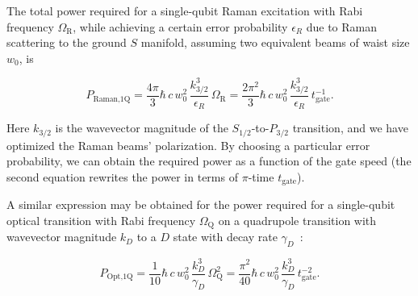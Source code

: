 \documentclass[%
12pt,
 amsmath,amssymb,
]{revtex4-2}
\begin{document}
The total power required for a single-qubit Raman excitation with Rabi frequency $\Omega_{\textrm{R}}$, while achieving a certain error probability $\epsilon_R$ due to Raman scattering to the ground $S$ manifold, assuming two equivalent beams of waist size $w_0$, is~\cite{PhysRevA.75.042329_2007}

\begin{equation}
P_{\textrm{Raman,1Q}}=\frac{4\pi}{3} \hbar\, c\, w_{0}^{2}\, \frac{k_{3/2}^{3}}{\epsilon_R}\, \Omega_{\textrm{R}}=\frac{2\pi^{2}}{3} \hbar\, c\, w_{0}^{2}\, \frac{k_{3/2}^{3}}{\epsilon_R}\, t^{-1}_{\textrm{gate}}.
\label{p_raman}
\end{equation}


\noindent Here $k_{3/2}$ is the wavevector magnitude of the $S_{1/2}$-to-$P_{3/2}$ transition, and we have optimized the Raman beams' polarization.  By choosing a particular error probability, we can obtain the required power as a function of the gate speed (the second equation rewrites the power in terms of $\pi$-time $t_{\textrm{gate}}$).

A similar expression may be obtained for the power required for a single-qubit optical transition with Rabi frequency $\Omega_{\textrm{Q}}$ on a quadrupole transition with wavevector magnitude $k_{D}$ to a $D$ state with decay rate $\gamma_{D}$~\cite{James1998}:

\begin{equation}
P_{\textrm{Opt,1Q}}=\frac{1}{10} \hbar\, c\, w_{0}^{2}\, \frac{k_{D}^{3}}{\gamma_{D}}\, \Omega^{2}_{\textrm{Q}}=\frac{\pi^{2}}{40} \hbar\, c\, w_{0}^{2}\, \frac{k_{D}^{3}}{\gamma_{D}}\, t^{-2}_{\textrm{gate}}.
\label{p_optical}
\end{equation}
\end{document}

